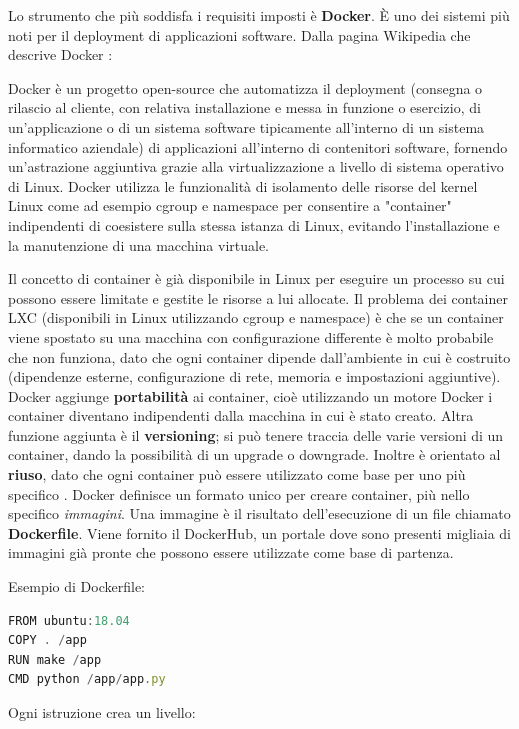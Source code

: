 \documentclass[a4paper,10pt]{memoir}
\begin{document}
Lo strumento che più soddisfa i requisiti imposti è \textbf{Docker}.
È uno dei sistemi più noti per il deployment di applicazioni software. Dalla pagina Wikipedia che descrive Docker
\cite{wikidocker}:
\begin{quoting}[font=itshape, begintext={``}, endtext={``}]
Docker è un progetto open-source che automatizza il deployment (consegna o rilascio al cliente, con relativa installazione e messa in funzione o esercizio, di un'applicazione o di un sistema software tipicamente all'interno di un sistema informatico aziendale) di applicazioni all'interno di contenitori software, fornendo un'astrazione aggiuntiva grazie alla virtualizzazione a livello di sistema operativo di Linux. Docker utilizza le funzionalità di isolamento delle risorse del kernel Linux come ad esempio cgroup e namespace per consentire a "container" indipendenti di coesistere sulla stessa istanza di Linux, evitando l'installazione e la manutenzione di una macchina virtuale.
\end{quoting}

Il concetto di container è già disponibile in Linux per eseguire un processo su cui possono essere limitate e gestite le risorse a lui allocate. Il problema dei container LXC (disponibili in Linux utilizzando cgroup e namespace) è che se un container viene spostato su una macchina con configurazione differente è molto probabile che non funziona, dato che ogni container dipende dall'ambiente in cui è costruito (dipendenze esterne, configurazione di rete, memoria e
impostazioni aggiuntive). Docker aggiunge \textbf{portabilità} ai container, cioè utilizzando un motore Docker i container diventano indipendenti dalla macchina in cui è stato creato. Altra funzione aggiunta è il \textbf{versioning}; si può tenere traccia delle varie versioni di un container, dando la possibilità di un upgrade o downgrade. Inoltre è orientato al \textbf{riuso},     dato che ogni container può essere utilizzato come base per uno più specifico \cite{docker-portability}.
Docker definisce un formato unico per creare container, più nello specifico \textit{immagini}. Una immagine è il risultato dell'esecuzione di un file chiamato \textbf{Dockerfile}. Viene fornito il DockerHub, un portale dove sono presenti migliaia di immagini già pronte che possono essere utilizzate come base di partenza.

\vspace{0.02\textwidth}
\begin{center}
Esempio di Dockerfile:
\begin{lstlisting}[language=Javascript]
FROM ubuntu:18.04
COPY . /app
RUN make /app
CMD python /app/app.py
\end{lstlisting}
\end{center}
Ogni istruzione crea un livello:
\end{document}
